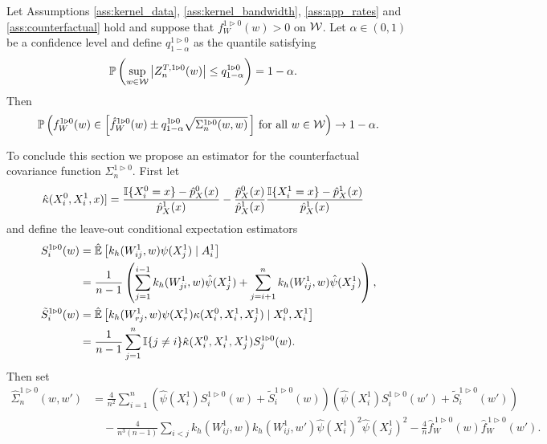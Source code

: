 \begin{theorem}
  \label{thm:counterfactual_infeasible_ucb}

  Let Assumptions \ref{ass:kernel_data}, \ref{ass:kernel_bandwidth},
  \ref{ass:app_rates} and \ref{ass:counterfactual}
  hold and suppose that $f_W^{1 \triangleright 0}(w) > 0$ on $\mathcal{W}$.
  Let $\alpha \in (0,1)$ be a confidence level
  and define $q^{1 \triangleright 0}_{1-\alpha}$ as the quantile
  satisfying
  \begin{align*}
    \mathbb{P}\left(
      \sup_{w \in \mathcal{W}}
      \left| Z_n^{T,1 \triangleright 0}(w) \right|
      \leq q^{1 \triangleright 0}_{1-\alpha}
    \right)
    &=
    1 - \alpha.
  \end{align*}
  Then
  \begin{align*}
    \mathbb{P}\left(
      f_W^{1 \triangleright 0}(w)
      \in
      \left[
        \hat f_W^{1 \triangleright 0}(w)
        \pm
        q^{1 \triangleright 0}_{1-\alpha}
        \sqrt{\Sigma_n^{1 \triangleright 0}(w,w)}
        \, \right]
      \, \textup{for all }
      w \in \mathcal{W}
    \right)
    \to 1 - \alpha.
  \end{align*}
\end{theorem}
%
To conclude this section we propose an estimator
for the counterfactual covariance function
$\Sigma_n^{1 \triangleright 0}$.
First let
%
\begin{align*}
  \hat\kappa(X_i^0, X_i^1, x)]
  &=
  \frac{\mathbb{I}\{X_i^0 = x\} - \hat p_X^0(x)}{\hat p_X^1(x)}
  - \frac{\hat p_X^0(x)}{\hat p_X^1(x)}
  \frac{\mathbb{I}\{X_i^1 = x\} - \hat p_X^1(x)}{\hat p_X^1(x)}
\end{align*}
%
and define the leave-out conditional expectation estimators
%
\begin{align*}
  S_i^{1 \triangleright 0}(w)
  &=
  \hat{\mathbb{E}}\left[
    k_h(W_{ij}^1,w) \psi(X_j^1) \mid A_i^1
  \right] \\
  &=
  \frac{1}{n-1}
  \left(
    \sum_{j=1}^{i-1}
    k_h(W_{ji}^1,w) \hat\psi(X_j^1)
    + \sum_{j=i+1}^n
    k_h(W_{ij}^1,w) \hat\psi(X_j^1)
  \right), \\
  \tilde S_i^{1 \triangleright 0}(w)
  &=
  \hat{\mathbb{E}}\left[
    k_h(W_{r j}^1,w) \psi(X_r^1)
    \kappa(X_i^0, X_i^1, X_j^1) \mid X_i^0, X_i^1
  \right] \\
  &=
  \frac{1}{n-1}
  \sum_{j=1}^n
  \mathbb{I}\{j \neq i\}
  \hat\kappa(X_i^0, X_i^1, X_j^1)
  S_j^{1 \triangleright 0}(w).
\end{align*}
%
Then set
%
\begin{align*}
  \hat\Sigma_n^{1 \triangleright 0}(w,w')
  &=
  \frac{4}{n^2}
  \sum_{i=1}^n
  \left(
    \hat\psi(X_i^1)
    S_i^{1 \triangleright 0}(w)
    + \tilde S_i^{1 \triangleright 0}(w)
  \right)
  \left(
    \hat\psi(X_i^1)
    S_i^{1 \triangleright 0}(w')
    + \tilde S_i^{1 \triangleright 0}(w')
  \right) \\
  &\quad-
  \frac{4}{n^3(n-1)}
  \sum_{i<j}
  k_h(W_{ij}^1, w)
  k_h(W_{ij}^1, w')
  \hat\psi(X_i^1)^2
  \hat\psi(X_j^1)^2
  - \frac{4}{n}
  \hat f_W^{\,1 \triangleright 0}(w)
  \hat f_W^{\,1 \triangleright 0}(w').
\end{align*}
